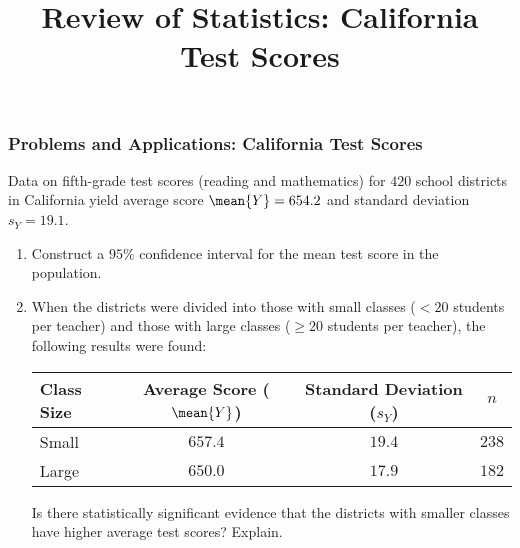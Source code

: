 \title[Probability]{Review of Statistics: California Test Scores}
\date{}







\begin{frame}
\frametitle{Problems and Applications: California Test Scores}
Data on fifth-grade test scores (reading and mathematics) for $420$ school districts in California yield average score $\mean{Y}=654.2$ and standard deviation $s_{Y}=19.1$.
\pause
\begin{enumerate}
\item Construct a $95\%$ confidence interval for the mean test score in the population.
\item When the districts were divided into those with small classes ($< 20$ students per teacher) and those with large classes ($\geq 20$ students per teacher), the following results were found:
\begin{center}
\begin{tabular}{lccc}
\toprule
Class Size & Average Score ($\mean{Y}$)      
                     & Standard Deviation ($s_{Y}$)
                               &   $n$\\
\midrule
Small      & $657.4$ &  $19.4$ & $238$\\
Large      & $650.0$ &  $17.9$ & $182$\\
\bottomrule
\end{tabular}
\end{center}
Is there statistically significant evidence that the districts with smaller classes have higher average test scores? Explain.
\end{enumerate}
\end{frame}


